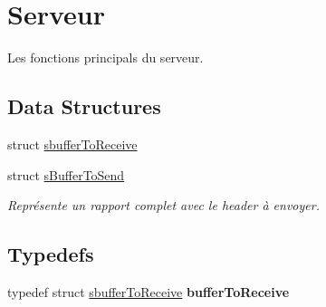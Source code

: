 \hypertarget{group__serveur}{}\section{Serveur}
\label{group__serveur}


Les fonctions principals du serveur.  


\subsection*{Data Structures}
\begin{DoxyCompactItemize}
\item 
struct \hyperlink{structsbuffer_to_receive}{sbuffer\+To\+Receive}
\item 
struct \hyperlink{structs_buffer_to_send}{s\+Buffer\+To\+Send}
\begin{DoxyCompactList}\small\item\em Représente un rapport complet avec le header à envoyer. \end{DoxyCompactList}\end{DoxyCompactItemize}
\subsection*{Typedefs}
\begin{DoxyCompactItemize}
\item 
\hypertarget{group__serveur_ga7b4ade66d05d5ca3180ad3b42342a89a}{}typedef struct \hyperlink{structsbuffer_to_receive}{sbuffer\+To\+Receive} {\bfseries buffer\+To\+Receive}\label{group__serveur_ga7b4ade66d05d5ca3180ad3b42342a89a}

\end{DoxyCompactItemize}
